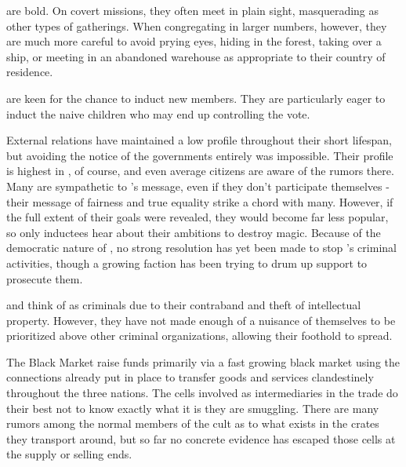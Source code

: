 \documentclass[blue]{GL2020}
\begin{document}
\pCult are bold. On covert missions, they often meet in plain sight, masquerading as other types of gatherings. When congregating in larger numbers, however, they are much more careful to avoid prying eyes, hiding in the forest, taking over a ship, or meeting in an abandoned warehouse as appropriate to their country of residence.

\pCult are keen for the chance to induct new members. They are particularly eager to induct the naive children who may end up controlling the vote.

External relations
\pCult have maintained a low profile throughout their short lifespan, but avoiding the notice of the governments entirely was impossible. Their profile is highest in \pViking, of course, and even average citizens are aware of the rumors there. Many \pViking{\people} are sympathetic to \cCult's message, even if they don’t participate themselves - their message of fairness and true equality strike a chord with many. However, if the full extent of their goals were revealed, they would become far less popular, so only inductees hear about their ambitions to destroy magic. Because of the democratic nature of \pViking, no strong resolution has yet been made to stop \pCult's criminal activities, though a growing faction has been trying to drum up support to prosecute them.

\pTech and \pFarm think of \pCult as criminals due to their contraband and theft of intellectual property. However, they have not made enough of a nuisance of themselves to be prioritized above other criminal organizations, allowing their foothold to spread.

The Black Market
\pCult raise funds primarily via a fast growing black market using the connections already put in place to transfer goods and services clandestinely throughout the three nations. The cells involved as intermediaries in the trade do their best not to know exactly what it is they are smuggling. There are many rumors among the normal members of the cult as to what exists in the crates they transport around, but so far no concrete evidence has escaped those cells at the supply or selling ends.
\end{document}
